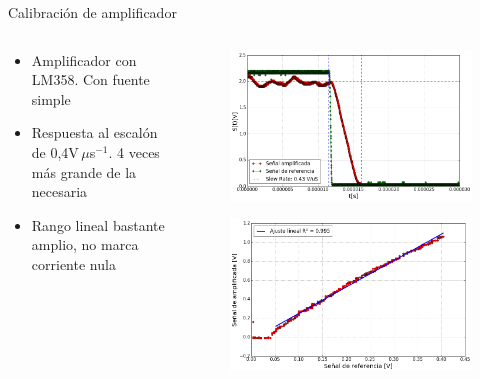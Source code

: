 \begin{frame}{Calibración de amplificador}

\begin{columns}[c]
    \begin{column}{0.4\textwidth}
        \begin{itemize}
        \item Amplificador con LM358. Con fuente simple
        \item Respuesta al escalón de 0,4V$\,\mu$s$^{-1}$. 4 veces más grande de la necesaria
        \item Rango lineal bastante amplio, no marca corriente nula
        \end{itemize}
    \end{column}
    \begin{column}{0.5\textwidth}
        \vspace{-1em}
        \begin{figure}[H]
            \centering
            \includegraphics[width=\textwidth]{fig/circuito/amp/transicion_amp}
            \label{fig:transicion_amp}
        \end{figure}
        \vspace{-2em}
        \begin{figure}[H]
            \centering
            \includegraphics[width=\textwidth]{fig/circuito/amp/lin_amp}
            \label{fig:circuito/amp/lin_amp}
        \end{figure}
    \end{column}
\end{columns}


\end{frame}

